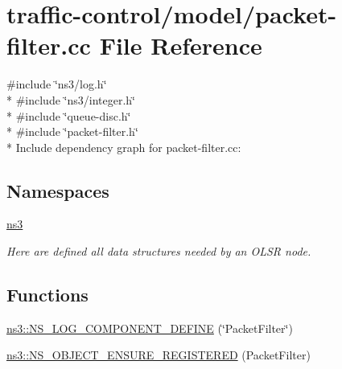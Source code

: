 \hypertarget{packet-filter_8cc}{}\section{traffic-\/control/model/packet-\/filter.cc File Reference}
\label{packet-filter_8cc}
{\ttfamily \#include \char`\"{}ns3/log.\+h\char`\"{}}\\*
{\ttfamily \#include \char`\"{}ns3/integer.\+h\char`\"{}}\\*
{\ttfamily \#include \char`\"{}queue-\/disc.\+h\char`\"{}}\\*
{\ttfamily \#include \char`\"{}packet-\/filter.\+h\char`\"{}}\\*
Include dependency graph for packet-\/filter.cc\+:
\subsection*{Namespaces}
\begin{DoxyCompactItemize}
\item 
 \hyperlink{namespacens3}{ns3}
\begin{DoxyCompactList}\small\item\em Here are defined all data structures needed by an O\+L\+SR node. \end{DoxyCompactList}\end{DoxyCompactItemize}
\subsection*{Functions}
\begin{DoxyCompactItemize}
\item 
\hyperlink{namespacens3_a050b1bc4a8f7f7e7fc5134832c9c4c95}{ns3\+::\+N\+S\+\_\+\+L\+O\+G\+\_\+\+C\+O\+M\+P\+O\+N\+E\+N\+T\+\_\+\+D\+E\+F\+I\+NE} (\char`\"{}Packet\+Filter\char`\"{})
\item 
\hyperlink{namespacens3_ae211e1e34b3d8338bed38c8c54c0c135}{ns3\+::\+N\+S\+\_\+\+O\+B\+J\+E\+C\+T\+\_\+\+E\+N\+S\+U\+R\+E\+\_\+\+R\+E\+G\+I\+S\+T\+E\+R\+ED} (Packet\+Filter)
\end{DoxyCompactItemize}
